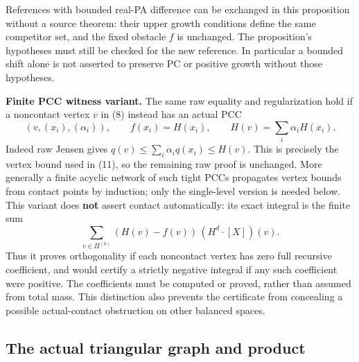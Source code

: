 \documentclass[
  10pt,
]{article}
\begin{document}
References with bounded real-PA difference can be exchanged in this
proposition without a source theorem: their upper growth conditions
define the same competitor set, and the fixed obstacle \(f\) is
unchanged. The proposition's hypotheses must still be checked for the
new reference. In particular a bounded shift alone is not asserted to
preserve PC or positive growth without those hypotheses.

\textbf{Finite PCC witness variant.} The same raw equality and
regularization hold if a noncontact vertex \(v\) in (8) instead has an
actual PCC \[
 (v,(x_i),(\alpha_i)),\qquad f(x_i)=H(x_i),\qquad
                         H(v)=\sum_i\alpha_i H(x_i).          \tag{24}
\] Indeed raw Jensen gives \(q(v)\leq\sum_i\alpha_i q(x_i)\leq H(v)\).
This is precisely the vertex bound used in (11), so the remaining raw
proof is unchanged. More generally a finite acyclic network of such
tight PCCs propagates vertex bounds from contact points by induction;
only the single-level version is needed below. This variant does
\textbf{not} assert contact automatically: its exact integral is the
finite sum \[
 \sum_{v\in\Pi^{(0)}}(H(v)-f(v))\,(H^d\cdot[X])(v).           \tag{25}
\] Thus it proves orthogonality if each noncontact vertex has zero full
recursive coefficient, and would certify a strictly negative integral if
any such coefficient were positive. The coefficients must be computed or
proved, rather than assumed from total mass. This distinction also
prevents the certificate from concealing a possible actual-contact
obstruction on other balanced spaces.

\subsection{The actual triangular graph and
product}\label{the-actual-triangular-graph-and-product}
\end{document}
